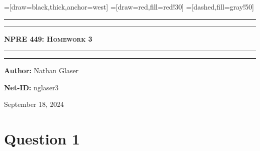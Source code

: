\documentclass{article}
\begin{document}
=[draw=black,thick,anchor=west]
=[draw=red,fill=red!30]
=[dashed,fill=gray!50]
\begin{titlepage}

\centering
\scshape
\vspace{\baselineskip}

%
\rule{\textwidth}{1.6pt}\vspace*{-\baselineskip}\vspace*{2pt}
\rule{\textwidth}{0.4pt}

{\Huge \textbf{\textsc{NPRE 449: Homework 3 \\
\vspace{15pt}}}}

\rule{\textwidth}{0.4pt}\vspace*{-\baselineskip}\vspace{3.2pt}
\rule{\textwidth}{1.6pt}\vspace{6pt}
\vspace{1.5\baselineskip}


\large \centerline{\textbf{Author:} Nathan Glaser}
\large \centerline{\textbf{Net-ID:} nglaser3}
\quad

\vfill
\large \centerline{September 18, 2024}
%
\end{titlepage}

\tableofcontents
\newpage
{}

\section*{Question 1}
\end{document}
